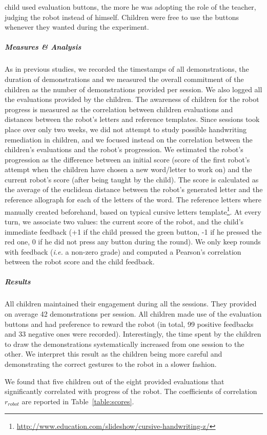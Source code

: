 \documentclass[10pt,a4paper]{article}
\newcommand{\ie}{\textit{i.e.}\xspace}
\begin{document}
child used evaluation buttons, the more he was adopting the role of the teacher, judging the
robot instead of himself. Children were free to use the buttons whenever they wanted during the experiment.
\subparagraph{Measures \& Analysis}
As in previous studies, we recorded the timestamps of all demonstrations, the duration of demonstrations and we measured the overall commitment of the children as the number of demonstrations provided per session. 
We also logged all the evaluations provided by the children. The awareness of children for the robot progress is measured as the correlation between children evaluations and distances between the robot's letters and reference templates.
Since sessions took place over only two weeks, we did not attempt to study possible
handwriting remediation in children, and we focused instead on the correlation between the children's evaluations and the robot's progression.
We estimated the robot's progression as the difference between an initial score
(score of the first robot's attempt when the children have chosen a new word/letter to
work on) and the current robot's score (after being taught by the child). The
score is calculated as the average of the euclidean
distance between the robot's generated letter and the reference allograph for each of the letters of the
word. The reference letters where manually created beforehand, based on typical cursive letters template\footnote{\url{http://www.education.com/slideshow/cursive-handwriting-z/}}. At every turn, we associate two values: the current score of the robot, and the child's immediate feedback (+1 if the child pressed the green button, -1 if he pressed the red one, 0 if he did not press any button during the round). We only keep rounds with feedback (\ie a non-zero grade) and computed a Pearson's correlation between the robot score and the child feedback.
\subparagraph{Results}
All children maintained their engagement during all the sessions. They provided
on average 42 demonstrations per session. All children made use of the evaluation buttons and
had preference to reward the robot (in total, 99 positive feedbacks and 33 negative ones were recorded). Interestingly, the time spent by the children to draw the demonstrations systematically increased from one session to the other. We interpret this result as the children being more careful and demonstrating the correct gestures to the robot in a slower fashion.

We found that five children out of the eight provided evaluations that significantly correlated with progress of the robot. The coefficients of correlation $r_{robot}$ are reported in Table~\ref{table:scores}.
\end{document}
